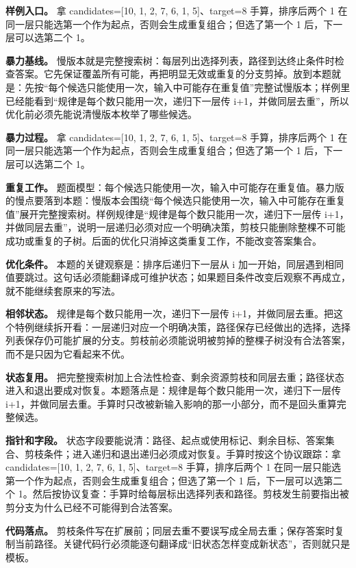 \textbf{样例入口。} 拿 candidates=[10, 1, 2, 7, 6, 1, 5]、target=8 手算，排序后两个 1 在同一层只能选第一个作为起点，否则会生成重复组合；但选了第一个 1 后，下一层可以选第二个 1。

\textbf{暴力基线。} 慢版本就是完整搜索树：每层列出选择列表，路径到达终止条件时检查答案。它先保证覆盖所有可能，再把明显无效或重复的分支剪掉。放到本题就是：先按“每个候选只能使用一次，输入中可能存在重复值”完整试慢版本；样例里已经能看到“规律是每个数只能用一次，递归下一层传 i+1，并做同层去重”，所以优化前必须先能说清慢版本枚举了哪些候选。

\textbf{暴力过程。} 拿 candidates=[10, 1, 2, 7, 6, 1, 5]、target=8 手算，排序后两个 1 在同一层只能选第一个作为起点，否则会生成重复组合；但选了第一个 1 后，下一层可以选第二个 1。

\textbf{重复工作。} 题面模型：每个候选只能使用一次，输入中可能存在重复值。暴力版的慢点要落到本题：慢版本会围绕“每个候选只能使用一次，输入中可能存在重复值”展开完整搜索树。样例规律是“规律是每个数只能用一次，递归下一层传 i+1，并做同层去重”，说明一层递归必须对应一个明确决策，剪枝只能删除整棵不可能成功或重复的子树。后面的优化只消掉这类重复工作，不能改变答案集合。

\textbf{优化条件。} 本题的关键观察是：排序后递归下一层从 i 加一开始，同层遇到相同值要跳过。这句话必须能翻译成可维护状态；如果题目条件改变后观察不再成立，就不能继续套原来的写法。

\textbf{相邻状态。} 规律是每个数只能用一次，递归下一层传 i+1，并做同层去重。把这个特例继续拆开看：一层递归对应一个明确决策，路径保存已经做出的选择，选择列表保存仍可能扩展的分支。剪枝前必须能说明被剪掉的整棵子树没有合法答案，而不是只因为它看起来不优。

\textbf{状态复用。} 把完整搜索树加上合法性检查、剩余资源剪枝和同层去重；路径状态进入和退出要成对恢复。本题落点是：规律是每个数只能用一次，递归下一层传 i+1，并做同层去重。手算时只改被新输入影响的那一小部分，而不是回头重算完整候选。

\textbf{指针和字段。} 状态字段要能说清：路径、起点或使用标记、剩余目标、答案集合、剪枝条件；进入递归和退出递归必须成对恢复。手算时按这个协议跟踪：拿 candidates=[10, 1, 2, 7, 6, 1, 5]、target=8 手算，排序后两个 1 在同一层只能选第一个作为起点，否则会生成重复组合；但选了第一个 1 后，下一层可以选第二个 1。然后按协议复查：手算时给每层标出选择列表和路径。剪枝发生前要指出被剪分支为什么已经不可能得到合法答案。

\textbf{代码落点。} 剪枝条件写在扩展前；同层去重不要误写成全局去重；保存答案时复制当前路径。关键代码行必须能逐句翻译成“旧状态怎样变成新状态”，否则就只是模板。

